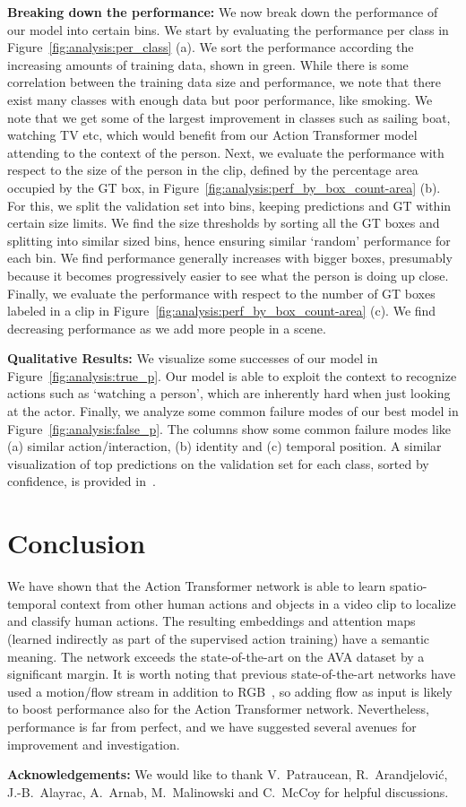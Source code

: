 \documentclass[10pt,twocolumn,letterpaper]{article}
\newcommand{\tx}[0]{Action Transformer}
\newcommand{\Tx}[0]{Action Transformer}
\begin{document}
{\bf \noindent Breaking down the performance:}
We now break down the performance of our model into certain bins. 
We start by evaluating the performance per class in Figure~\ref{fig:analysis:per_class} (a). We sort the performance according the increasing amounts of training data, shown in green. While there is some correlation between the training data size and performance, we note that there exist many classes with enough data but poor performance, like smoking. We note that we get some of the largest improvement in classes such as sailing boat, watching TV etc, which would benefit from our \tx{} model attending to the context of the person.
Next, we evaluate the performance with respect to the size of the person in the clip, defined by the percentage area occupied by the GT box, in Figure~\ref{fig:analysis:perf_by_box_count-area} (b). For this, we split the validation set into bins, keeping predictions and GT within certain size limits. We find the size thresholds by sorting all the GT boxes and splitting into similar sized bins, hence ensuring similar `random' performance for each bin. We find performance generally increases with bigger boxes, presumably because it becomes progressively easier to see what the person is doing up close.
Finally, we evaluate the performance with respect to the number of GT boxes labeled in a clip in Figure~\ref{fig:analysis:perf_by_box_count-area} (c). We find decreasing performance as we add more people in a scene.



{\bf \noindent Qualitative Results:}
We visualize some successes of our model in Figure~\ref{fig:analysis:true_p}.
Our model is able to exploit the context to recognize actions such as `watching a person', which are inherently hard when just looking at the actor.
Finally, we analyze some common failure modes of our best model in Figure~\ref{fig:analysis:false_p}. The columns show some common failure modes like (a) similar action/interaction, (b) identity and (c) temporal position.
A similar visualization of top predictions on the validation set for each class, sorted by confidence, is provided in~\cite{preds}. 




 \section{Conclusion}

We have shown that the \Tx{} network is able to learn spatio-temporal context from other human actions
and objects in a video clip to localize and classify human actions. The resulting embeddings and attention
maps (learned indirectly as part of the supervised action training) have 
a semantic meaning. 
The network exceeds the state-of-the-art on the AVA dataset by a significant margin.
It is worth noting that previous state-of-the-art networks
have used a motion/flow stream in addition to RGB~\cite{carreira2017quo,xie2017rethinking}, so adding
flow as input is likely to  boost performance also for the \Tx{} network.
Nevertheless, 
performance is far from perfect, and we have suggested
several avenues for improvement and investigation. 



{\small
{\bf \noindent Acknowledgements:}
We would like to thank V.\ Patraucean, R.\ Arandjelovi\'{c}, J.-B.\ Alayrac, A.\ Arnab, M.\ Malinowski and C.\ McCoy for helpful discussions.
} 
{\small


}
\end{document}
